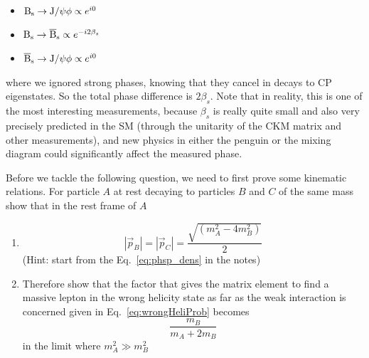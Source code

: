 {\begin{itemize}
\item ${\rm B_s \to J/\psi \phi} \propto e^{i0}$
\item ${\rm B_s \to \overline{B}_s} \propto e^{-i 2 \beta_s}$
\item ${\rm \overline{B}_s \to J/\psi \phi} \propto e^{i0}$
\end{itemize}
where we ignored strong phases, knowing that they cancel in decays to CP eigenstates. So the total phase difference is $2\beta_s$. Note that in reality, this is one of the most interesting measurements, because $\beta_s$ is really quite small and also very precisely predicted in the SM (through the unitarity of the CKM matrix and other measurements), and new physics in either the penguin or the mixing diagram could significantly affect the measured phase.
}

Before we tackle the following question, we need
to first prove some kinematic relations. For particle $A$ at rest
decaying to particles $B$ and $C$ of the same mass show that in the rest frame of $A$
\begin{enumerate}
\item \[|\vec{p}_{B}| = |\vec{p}_{C}| = \frac{\sqrt{(m_{A}^{2}-4m_B^2)}}{2}\]
  (Hint: start from the Eq.~\ref{eq:phsp_dens} in the notes)
  \item Therefore show that the factor that gives the matrix element to find a massive lepton
    in the wrong helicity state as far as the weak interaction is concerned given in Eq.~\ref{eq:wrongHeliProb} becomes
    \[
      \frac{m_B}{m_A+2m_B}
    \]
      in the limit where $m_{A}^{2}\gg m_{B}^{2}$
\end{enumerate}



